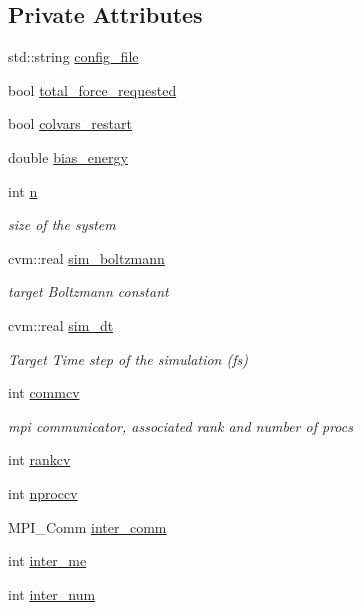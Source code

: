 \subsection*{Private Attributes}
\begin{DoxyCompactItemize}
\item 
std\-::string \hyperlink{classcolvarproxy__tinkerhp_a34ebcc6f4b694166fe32fb0ea331ba78}{config\-\_\-file}
\item 
bool \hyperlink{classcolvarproxy__tinkerhp_a46e10d9afd59cffa031381605e6bf986}{total\-\_\-force\-\_\-requested}
\item 
bool \hyperlink{classcolvarproxy__tinkerhp_ada013faba57ea5b6e37f40f737593a7f}{colvars\-\_\-restart}
\item 
double \hyperlink{classcolvarproxy__tinkerhp_a6fb1b3de3b126782968dc7146a031ff4}{bias\-\_\-energy}
\item 
int \hyperlink{classcolvarproxy__tinkerhp_a211e5eea0626d40e351455601f116c21}{n}
\begin{DoxyCompactList}\small\item\em size of the system \end{DoxyCompactList}\item 
cvm\-::real \hyperlink{classcolvarproxy__tinkerhp_a0bd848796b227c5518d18e4e92595b1f}{sim\-\_\-boltzmann}
\begin{DoxyCompactList}\small\item\em target Boltzmann constant \end{DoxyCompactList}\item 
cvm\-::real \hyperlink{classcolvarproxy__tinkerhp_a29bb1f101010fea6079b4d0045b93389}{sim\-\_\-dt}
\begin{DoxyCompactList}\small\item\em Target Time step of the simulation (fs) \end{DoxyCompactList}\item 
int \hyperlink{classcolvarproxy__tinkerhp_ac0ce2e771bc43eacc450f68d07c6a6b2}{commcv}
\begin{DoxyCompactList}\small\item\em mpi communicator, associated rank and number of procs \end{DoxyCompactList}\item 
int \hyperlink{classcolvarproxy__tinkerhp_a5db0b78cc2d62920b9969b3e6bee8f6a}{rankcv}
\item 
int \hyperlink{classcolvarproxy__tinkerhp_a9d7fa46ab2c701068dcbe1d17521a0c1}{nproccv}
\item 
M\-P\-I\-\_\-\-Comm \hyperlink{classcolvarproxy__tinkerhp_af95a5d16bb33e00c0b5c55fb470af8df}{inter\-\_\-comm}
\item 
int \hyperlink{classcolvarproxy__tinkerhp_aeb08de923f57cf20ab17684d8a21146d}{inter\-\_\-me}
\item 
int \hyperlink{classcolvarproxy__tinkerhp_a3d7cc5da0cad26eae4e25b3186b380bb}{inter\-\_\-num}
\end{DoxyCompactItemize}


